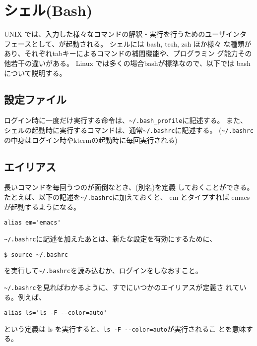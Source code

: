 \documentclass{jreport}
\begin{document}
\chapter{シェル(Bash)}

UNIX では、入力した様々なコマンドの解釈・実行を行うためのユーザインタ
フェースとして、が起動される。
シェルには bash, tcsh, zsh ほか様々
な種類があり、それぞれtabキーによるコマンドの補間機能や、プログラミン
グ能力その他若干の違いがある。
Linux では多くの場合bashが標準なので、以下では bash について説明する。

\section{設定ファイル}

ログイン時に一度だけ実行する命令は、\verb|~/.bash_profile|に記述する。
また、シェルの起動時に実行するコマンドは、通常\verb|~/.bashrc|に記述する。
(\verb|~/.bashrc|の中身はログイン時やktermの起動時に毎回実行される)

\section{エイリアス}
長いコマンドを毎回うつのが面倒なとき、(別名)を定義
しておくことができる。
たとえば、以下の記述を\verb|~/.bashrc|に加えておくと、
em とタイプすれば emacsが起動するようになる。
\begin{screen}
\begin{verbatim}
alias em='emacs'
\end{verbatim}
\end{screen}
\verb|~/.bashrc|に記述を加えたあとは、新たな設定を有効にするために、
\begin{screen}
\begin{verbatim}
$ source ~/.bashrc
\end{verbatim}
\end{screen}
を実行して\verb|~/.bashrc|を読み込むか、ログインをしなおすこと。

\verb|~/.bashrc|を見ればわかるように、すでにいつかのエイリアスが定義さ
れている。例えば、
\begin{screen}
\begin{verbatim}
alias ls='ls -F --color=auto'
\end{verbatim}
\end{screen}
という定義は ls を実行すると、\verb|ls -F --color=auto|が実行されるこ
とを意味する。
\end{document}
